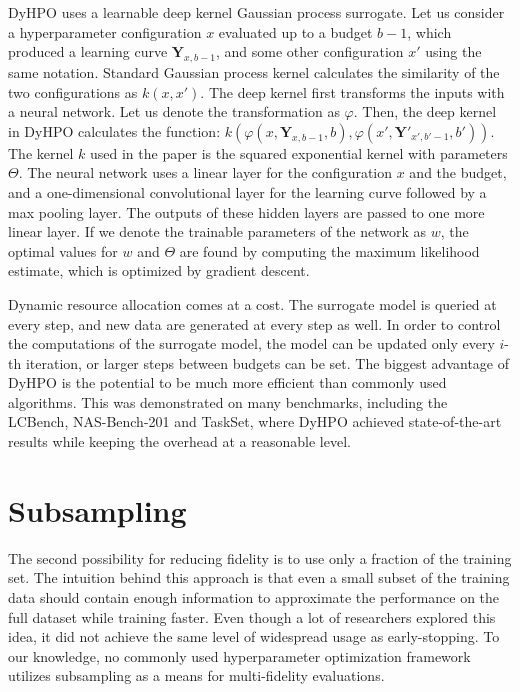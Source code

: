 DyHPO uses a learnable deep kernel Gaussian process surrogate. Let us consider a hyperparameter configuration $x$ evaluated up to a budget $b-1$, which produced a learning curve $\mathbf{Y}_{x,b-1}$, and some other configuration $x'$ using the same notation. Standard Gaussian process kernel calculates the similarity of the two configurations as $k(x,x')$. The deep kernel first transforms the inputs with a neural network. Let us denote the transformation as $\varphi$. Then, the deep kernel in DyHPO calculates the function: $k(\varphi(x,\mathbf{Y}_{x,b-1}, b), \varphi(x',\mathbf{Y}'_{x',b'-1}, b'))$. The kernel $k$ used in the paper is the squared exponential kernel with parameters $\Theta$. The neural network uses a linear layer for the configuration $x$ and the budget, and a one-dimensional convolutional layer for the learning curve followed by a max pooling layer. The outputs of these hidden layers are passed to one more linear layer. If we denote the trainable parameters of the network as $w$, the optimal values for $w$ and $\Theta$ are found by computing the maximum likelihood estimate, which is optimized by gradient descent.

Dynamic resource allocation comes at a cost. The surrogate model is queried at every step, and new data are generated at every step as well. In order to control the computations of the surrogate model, the model can be updated only every $i$-th iteration, or larger steps between budgets can be set. The biggest advantage of DyHPO is the potential to be much more efficient than commonly used algorithms. This was demonstrated on many benchmarks, including the LCBench, NAS-Bench-201 and TaskSet, where DyHPO achieved state-of-the-art results while keeping the overhead at a reasonable level.



\section{Subsampling}
The second possibility for reducing fidelity is to use only a fraction of the training set. The intuition behind this approach is that even a small subset of the training data should contain enough information to approximate the performance on the full dataset while training faster. Even though a lot of researchers explored this idea, it did not achieve the same level of widespread usage as early-stopping. To our knowledge, no commonly used hyperparameter optimization framework utilizes subsampling as a means for multi-fidelity evaluations.

